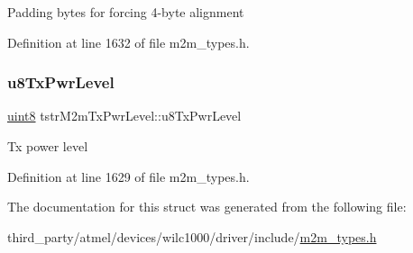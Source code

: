 Padding bytes for forcing 4-\/byte alignment 

Definition at line 1632 of file m2m\+\_\+types.\+h.

\mbox{\label{structtstrM2mTxPwrLevel_ab62abb8131e3179d272a7f751b95d607}} 
\subsubsection{\texorpdfstring{u8\+Tx\+Pwr\+Level}{u8TxPwrLevel}}
{\footnotesize\ttfamily \hyperlink{group__DataT_ga4df709a77647e870bbf1d955b8edc9a6}{uint8} tstr\+M2m\+Tx\+Pwr\+Level\+::u8\+Tx\+Pwr\+Level}

Tx power level 

Definition at line 1629 of file m2m\+\_\+types.\+h.



The documentation for this struct was generated from the following file\+:\begin{DoxyCompactItemize}
\item 
third\+\_\+party/atmel/devices/wilc1000/driver/include/\hyperlink{m2m__types_8h}{m2m\+\_\+types.\+h}\end{DoxyCompactItemize}
